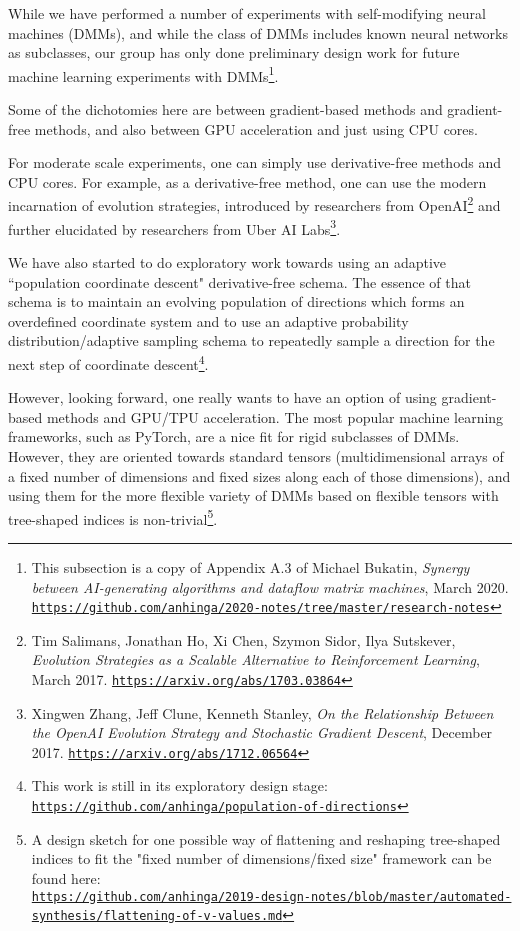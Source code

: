 \documentclass{article}
\begin{document}
While we have performed a number of experiments with self-modifying neural machines (DMMs),
and while the class of DMMs includes known neural networks as subclasses,
our group has only done preliminary design work for future machine learning experiments with DMMs\footnote{This subsection
is a copy of Appendix A.3 of Michael Bukatin, {\em Synergy between AI-generating algorithms and dataflow matrix machines},
March 2020.
\href{https://github.com/anhinga/2020-notes/tree/master/research-notes}
{\tt https://github.com/anhinga/2020-notes/tree/master/research-notes}}.

Some of the dichotomies here are between gradient-based methods and gradient-free methods,
and also between GPU acceleration and just using CPU cores.

For moderate scale experiments, one can simply use derivative-free methods and CPU cores.
For example, as a derivative-free method, one can use the modern incarnation of evolution strategies, introduced by researchers from OpenAI\footnote{Tim Salimans, Jonathan Ho, Xi Chen, Szymon Sidor, Ilya Sutskever, {\em Evolution Strategies as a Scalable Alternative to Reinforcement Learning}, March 2017.
\href{https://arxiv.org/abs/1703.03864}{\tt https://arxiv.org/abs/1703.03864}}  and
further elucidated by researchers from Uber AI Labs\footnote{Xingwen Zhang, Jeff Clune, Kenneth Stanley,
{\em On the Relationship Between the OpenAI Evolution Strategy and Stochastic Gradient Descent}, December 2017.
\href{https://arxiv.org/abs/1712.06564}{\tt https://arxiv.org/abs/1712.06564}}. 

We have also started to do
exploratory work towards using an adaptive ``population coordinate descent" derivative-free schema. The essence of
that schema is to maintain an evolving
population of directions which forms an overdefined coordinate system and to use an adaptive probability distribution/adaptive
sampling schema to repeatedly sample a direction for the next step of coordinate descent\footnote{This work is
still in its exploratory design stage: 
\href{https://github.com/anhinga/population-of-directions}{\tt https://github.com/anhinga/population-of-directions}}.

However, looking forward, one really wants to have an option of using gradient-based methods and GPU/TPU
acceleration. The most popular machine learning frameworks, such as PyTorch, are a nice fit for rigid subclasses
of DMMs. However, they are oriented towards standard tensors (multidimensional arrays of a
fixed number of dimensions and fixed sizes along each of those dimensions), and using them for the more flexible variety of DMMs based on flexible tensors
with tree-shaped indices is non-trivial\footnote{A design sketch for one possible way of flattening and reshaping
tree-shaped indices to fit the "fixed number of dimensions/fixed size" framework can be found
here:\\
\href{https://github.com/anhinga/2019-design-notes/blob/master/automated-synthesis/flattening-of-v-values.md}
{\tt https://github.com/anhinga/2019-design-notes/blob/master/automated-synthesis/flattening-of-v-values.md}}.
\end{document}
